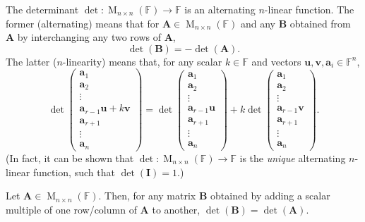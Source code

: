 \documentclass[../Notes.tex]{subfiles}
\begin{document}
\begin{theorem}{}{}
    The determinant \(\det\colon \operatorname{M}_{n \times n}(\mathbb{F})\to \mathbb{F}\) is an alternating \(n\)-linear function. The former (alternating) means that for \(\mathbf{A}\in \operatorname{M}_{n \times n}(\mathbb{F})\) and any \(\mathbf{B}\) obtained from \(\mathbf{A}\) by interchanging any two rows of \(\mathbf{A}\),
    \[\det(\mathbf{B})=-\det(\mathbf{A}).\]
    The latter (\(n\)-linearity) means that, for any scalar \(k \in \mathbb{F}\) and vectors \(\mathbf{u},\mathbf{v},\mathbf{a}_i\in \mathbb{F}^n\),
    \[\det\begin{pmatrix}
        \mathbf{a}_1\\
        \mathbf{a}_2\\
        \vdots\\
        \mathbf{a}_{r-1}
        \mathbf{u}+k\mathbf{v}\\
        \mathbf{a}_{r+1}\\
        \vdots\\
        \mathbf{a}_n
    \end{pmatrix}=
    \det\begin{pmatrix}
        \mathbf{a}_1\\
        \mathbf{a}_2\\
        \vdots\\
        \mathbf{a}_{r-1}
        \mathbf{u}\\
        \mathbf{a}_{r+1}\\
        \vdots\\
        \mathbf{a}_n
    \end{pmatrix}+
    k\det\begin{pmatrix}
        \mathbf{a}_1\\
        \mathbf{a}_2\\
        \vdots\\
        \mathbf{a}_{r-1}
        \mathbf{v}\\
        \mathbf{a}_{r+1}\\
        \vdots\\
        \mathbf{a}_n
    \end{pmatrix}.\]
    (In fact, it can be shown that \(\det\colon \operatorname{M}_{n \times n}(\mathbb{F})\to \mathbb{F}\) is the \emph{unique} alternating \(n\)-linear function, such that \(\det(\mathbf{I})=1\).)
\end{theorem}
\begin{corollary}{}{}
    Let \(\mathbf{A}\in \operatorname{M}_{n \times n}(\mathbb{F})\). Then, for any matrix \(\mathbf{B}\) obtained by adding a scalar multiple of one row/column of \(\mathbf{A}\) to another, \(\det(\mathbf{B})=\det(\mathbf{A})\).
\end{corollary}
\end{document}
